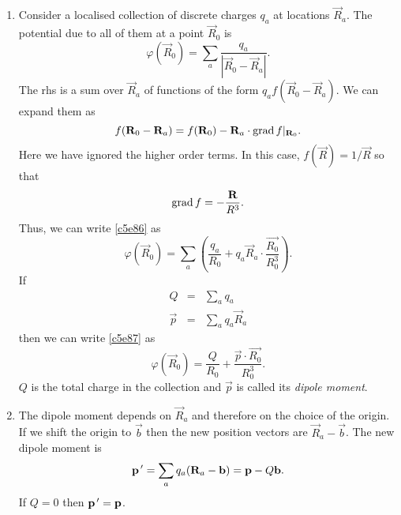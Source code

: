 \begin{enumerate}
\item Consider a localised collection of discrete charges $q_a$ at locations 
$\vec{R}_a$. The potential due to all of them at a point $\vec{R}_0$ is
\begin{equation}\label{c5e86}
\varphi(\vec{R}_0) = \sum_a\frac{q_a}{|\vec{R}_0 - \vec{R}_a|}.
\end{equation}
The rhs is a sum over $\vec{R}_a$ of functions of the form $q_af(\vec{R}_0-\vec{R}_a)$.
We can expand them as
\[
f(\mathbf{R}_0-\mathbf{R}_a) = f(\mathbf{R}_0) - \mathbf{R}_a\cdot\operatorname{grad} f|_{\mathbf{R}_0}.
\]
Here we have ignored the higher order terms. In this case, $f(\vec{R}) = 1/\vec{R}$
so that
\[
\operatorname{grad} f = -\frac{\mathbf{R}}{R^3}.
\]
Thus, we can write \eqref{c5e86} as
\begin{equation}\label{c5e87}
\varphi(\vec{R}_0) = 
\sum_a\left(\frac{q_a}{R_0} + q_a\vec{R}_a\cdot\frac{\vec{R_0}}{R_0^3}\right).
\end{equation}
If
\begin{eqnarray}
Q &=& \sum_a q_a \label{c5e88} \\
\vec{p} &=& \sum_a q_a\vec{R}_a \label{c5e89}
\end{eqnarray}
then we can write \eqref{c5e87} as
\begin{equation}\label{c5e90}
\varphi(\vec{R}_0) = \frac{Q}{R_0} + \frac{\vec{p}\cdot\vec{R_0}}{R_0^3}.
\end{equation}
$Q$ is the total charge in the collection and $\vec{p}$ is called its \emph{dipole
moment}.

\item The dipole moment depends on $\vec{R}_a$ and therefore on the choice of the
origin. If we shift the origin to $\vec{b}$ then the new position vectors are
$\vec{R}_a - \vec{b}$. The new dipole moment is
\begin{equation}\label{c5e91}
\mathbf{p}^{\,\prime} = \sum_a q_a (\mathbf{R}_a - \mathbf{b}) = \mathbf{p} - Q\mathbf{b}.
\end{equation}
If $Q = 0$ then $\mathbf{p}^{\,\prime} = \mathbf{p}$. 


\end{enumerate}
